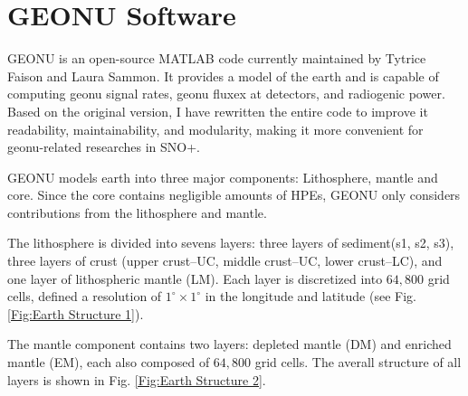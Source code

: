 		\section{GEONU Software}
			GEONU is an open-source MATLAB code currently maintained by Tytrice Faison and Laura Sammon\cite{Original_GEONU}. It provides a model of the earth and is capable of computing geonu signal rates, geonu fluxex at detectors, and radiogenic power. Based on the original version, I have rewritten the entire code to improve it readability, maintainability, and modularity, making it more convenient for geonu-related researches in SNO+.\par
			GEONU models earth into three major components: Lithosphere, mantle and core. Since the core contains negligible amounts of HPEs, GEONU only considers  contributions from the lithosphere and mantle.\par
			The lithosphere is divided into sevens layers: three layers of sediment(s1, s2, s3), three layers of crust (upper crust--UC, middle crust--UC, lower crust--LC), and one layer of lithospheric mantle (LM). Each layer is discretized into $64,800$ grid cells, defined a resolution of $1^\circ \times 1^\circ$ in the longitude and latitude (see Fig. \ref{Fig:Earth Structure 1}).\par
			The mantle component contains two layers: depleted mantle (DM) and enriched mantle (EM), each also composed of $64,800$ grid cells. The averall structure of all layers is shown in Fig. \ref{Fig:Earth Structure 2}.
